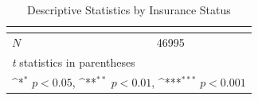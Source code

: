 \begin{table}[htbp]\centering
\def\sym#1{\ifmmode^{#1}\else\(^{#1}\)\fi}
\caption{Descriptive Statistics by Insurance Status}
\begin{tabular}{l*{1}{c}}
\hline\hline
            &\multicolumn{1}{c}{} \\
\hline
\hline
\(N\)       &       46995         \\
\hline\hline
\multicolumn{2}{l}{\footnotesize \textit{t} statistics in parentheses}\\
\multicolumn{2}{l}{\footnotesize \sym{*} \(p<0.05\), \sym{**} \(p<0.01\), \sym{***} \(p<0.001\)}\\
\end{tabular}
\end{table}

